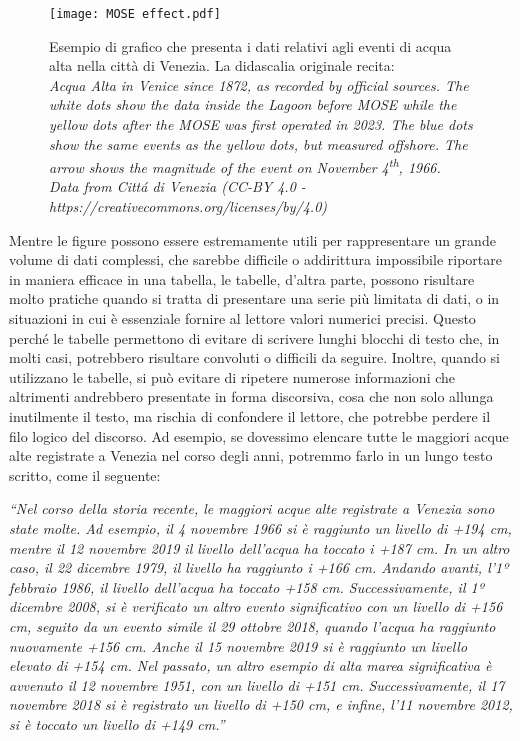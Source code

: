 \documentclass[9pt,a4paper,twoside]{rho-class/rho}
\begin{document}
\begin{figure}[t!]
    \centering
    \texttt{[image: MOSE effect.pdf]}
    \caption{Esempio di grafico che presenta i dati relativi agli eventi di acqua alta nella città di Venezia. La didascalia originale recita: \\ \textit{Acqua Alta in Venice since 1872, as recorded by official sources. The white dots show the data inside the Lagoon before MOSE while the yellow dots after the MOSE was first operated in 2023. The blue dots show the same events as the yellow dots, but measured offshore. The arrow shows the magnitude of the event on November 4\textsuperscript{th}, 1966. Data from Cittá di Venezia (CC-BY 4.0 - https://creativecommons.org/licenses/by/4.0)}}
    \label{fig:graph_example}
\end{figure}

Mentre le figure possono essere estremamente utili per rappresentare un grande volume di dati complessi, che sarebbe difficile o addirittura impossibile riportare in maniera efficace in una tabella, le tabelle, d’altra parte, possono risultare molto pratiche quando si tratta di presentare una serie più limitata di dati, o in situazioni in cui è essenziale fornire al lettore valori numerici precisi. Questo perché le tabelle permettono di evitare di scrivere lunghi blocchi di testo che, in molti casi, potrebbero risultare convoluti o difficili da seguire. Inoltre, quando si utilizzano le tabelle, si può evitare di ripetere numerose informazioni che altrimenti andrebbero presentate in forma discorsiva, cosa che non solo allunga inutilmente il testo, ma rischia di confondere il lettore, che potrebbe perdere il filo logico del discorso. Ad esempio, se dovessimo elencare tutte le maggiori acque alte registrate a Venezia nel corso degli anni, potremmo farlo in un lungo testo scritto, come il seguente:

\textit{“Nel corso della storia recente, le maggiori acque alte registrate a Venezia sono state molte. Ad esempio, il 4 novembre 1966 si è raggiunto un livello di +194 cm, mentre il 12 novembre 2019 il livello dell’acqua ha toccato i +187 cm. In un altro caso, il 22 dicembre 1979, il livello ha raggiunto i +166 cm. Andando avanti, l’1º febbraio 1986, il livello dell’acqua ha toccato +158 cm. Successivamente, il 1º dicembre 2008, si è verificato un altro evento significativo con un livello di +156 cm, seguito da un evento simile il 29 ottobre 2018, quando l’acqua ha raggiunto nuovamente +156 cm. Anche il 15 novembre 2019 si è raggiunto un livello elevato di +154 cm. Nel passato, un altro esempio di alta marea significativa è avvenuto il 12 novembre 1951, con un livello di +151 cm. Successivamente, il 17 novembre 2018 si è registrato un livello di +150 cm, e infine, l’11 novembre 2012, si è toccato un livello di +149 cm.”}
\end{document}
